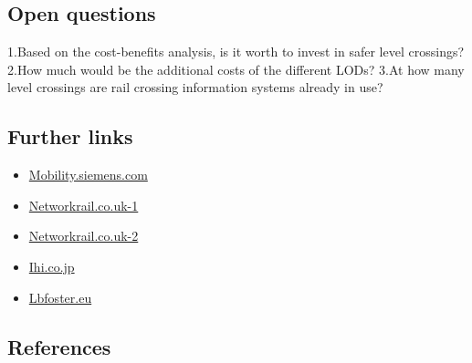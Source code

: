 \documentclass[
]{book}
\providecommand{\tightlist}{%
  \setlength{\itemsep}{0pt}\setlength{\parskip}{0pt}}
\begin{document}
\hypertarget{open-questions-1}{%
\subsection*{Open questions}\label{open-questions-1}}

1.Based on the cost-benefits analysis, is it worth to invest in safer level crossings?
2.How much would be the additional costs of the different LODs?
3.At how many level crossings are rail crossing information systems already in use?

\hypertarget{further-links-1}{%
\subsection*{Further links}\label{further-links-1}}

\begin{itemize}
\tightlist
\item
  \href{https://www.mobility.siemens.com/global/en/portfolio/rail/automation/signaling-on-board-and-crossing-products/crossings-overview/crossings-protection.html}{Mobility.siemens.com}
\item
  \href{https://www.networkrail.co.uk/communities/safety-in-the-community/railway-safety-campaigns/}{Networkrail.co.uk-1}
\item
  \href{https://www.networkrail.co.uk/communities/safety-in-the-community/level-crossing-safety/}{Networkrail.co.uk-2}
\item
  \href{https://www.ihi.co.jp/3DLaserRadar/en/products/01.html}{Ihi.co.jp}
\item
  \href{https://lbfoster.eu/en/control-and-display/solutions/remote-condition-monitoring/lidar-level-crossing-obstacle-detection/}{Lbfoster.eu}
\end{itemize}

\hypertarget{references-1}{%
\subsection*{References}\label{references-1}}
\end{document}
